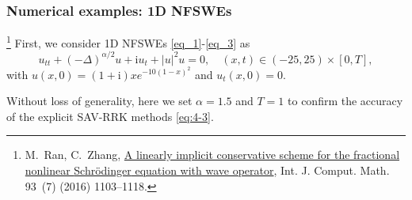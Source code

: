 \documentclass[aspectratio=169]{beamer}
\begin{document}
	
	\begin{frame}\frametitle{Numerical examples: 1D NFSWEs}
	  \begin{example}\label{ex:1}
	  \footnote{\tiny 	M.~Ran, C.~Zhang,
	  \href{http://www.tandfonline.com/doi/full/10.1080/00207160.2015.1016924}{A
	  linearly implicit conservative scheme for the fractional nonlinear
	  {{Schr\"odinger}} equation with wave operator}, Int. J. Comput. Math. 93~(7)
	  (2016) 1103--1118.
	} First, we consider 1D NFSWEs \eqref{eq_1}-\eqref{eq_3} as
	  \begin{equation}\label{eq_108}
	  u_{t t}+(-\Delta)^{\alpha / 2} u+\mathrm{i}u_t+|u|^2 u=0, \quad (x,t)\in  (-25, 25)\times[0, T],
	  \end{equation}
	  with $u(x, 0)=(1+\mathrm{i}) x e^{-10(1-x)^2}$ and $u_t(x, 0)=0$.
	  \end{example}
	
	Without loss of generality, here we set $\alpha=1.5$ and $T=1$ to confirm the accuracy of the explicit SAV-RRK methods \eqref{eq:4-3}.
	\end{frame}
	
	
	
\end{document}

